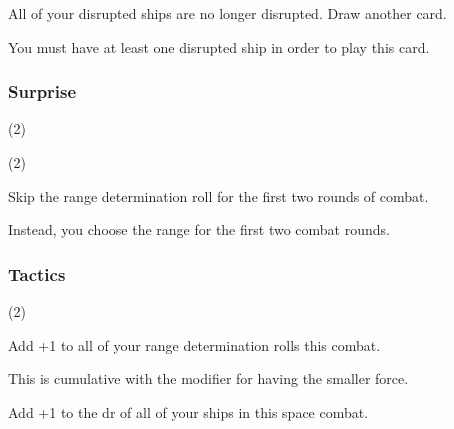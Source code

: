\documentclass[a4paper,11pt,twocolumn]{article}
\begin{document}

All of your disrupted ships are no longer disrupted. Draw another card.

You must have at least one disrupted ship in order to play this card.

\subsubsection{Surprise} (2)

 (2)

Skip the range determination roll for the first two rounds of combat.

Instead, you choose the range for the first two combat rounds.

\subsubsection{Tactics} (2)

Add +1 to all of your range determination rolls this combat.

This is cumulative with the modifier for having the smaller force.

Add +1 to the dr of all of your ships in this space combat.
\end{document}
